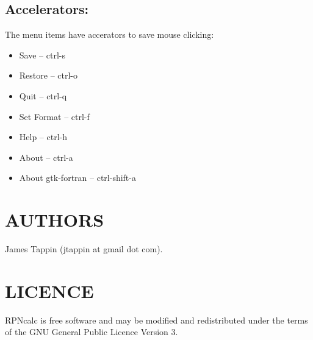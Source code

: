 \documentclass{article}
\begin{document}
\subsection{Accelerators:}

The menu items have accerators to save mouse clicking:

\begin{itemize}
\item Save -- ctrl-s
\item Restore -- ctrl-o
\item Quit -- ctrl-q
\item Set Format -- ctrl-f
\item Help -- ctrl-h
\item About -- ctrl-a
\item About gtk-fortran -- ctrl-shift-a
\end{itemize}

\section{AUTHORS}

James Tappin (jtappin at gmail dot com).

\section{LICENCE}

RPNcalc is free software and may be modified and redistributed under
the terms of the GNU General Public Licence Version 3.

\LatexManEnd
\end{document}
